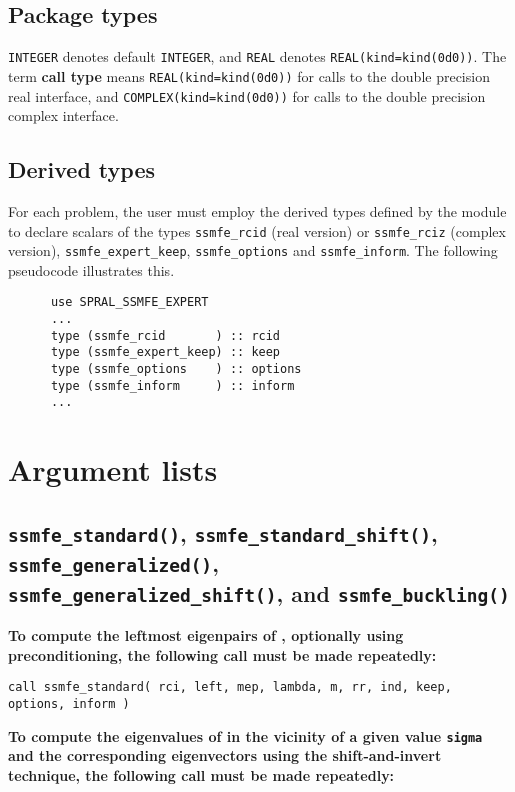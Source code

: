 \subsection{Package types} 

\texttt{INTEGER} denotes default \texttt{INTEGER}, and \texttt{REAL} denotes
\texttt{REAL(kind=kind(0d0))}. The term {\bf call type} means
\texttt{REAL(kind=kind(0d0))} for calls to the double precision real
interface, and \texttt{COMPLEX(kind=kind(0d0))} for calls to the double
precision complex interface.

\subsection{Derived types}

For each problem, the user must employ the derived types defined by the
module to declare scalars of the types 
{\tt ssmfe\_rcid} (real version) or 
{\tt ssmfe\_rciz} (complex version), 
{\tt ssmfe\_expert\_keep},
{\tt ssmfe\_options} and 
{\tt ssmfe\_inform}.
The following pseudocode illustrates this.
\begin{verbatim}
      use SPRAL_SSMFE_EXPERT
      ...
      type (ssmfe_rcid       ) :: rcid
      type (ssmfe_expert_keep) :: keep
      type (ssmfe_options    ) :: options
      type (ssmfe_inform     ) :: inform
      ...
\end{verbatim}


\section{Argument lists}

\subsection{%
   \texttt{ssmfe\_standard()},
   \texttt{ssmfe\_standard\_shift()},
   \texttt{ssmfe\_generalized()},\\
   \texttt{ssmfe\_generalized\_shift()}, and
   \texttt{ssmfe\_buckling()}
}

{\bf
To compute 
the leftmost eigenpairs of ,
optionally using preconditioning,
the following call must be made repeatedly:
}

\medskip
{\tt call
ssmfe\_standard( rci, left, mep, lambda, m, rr, ind, keep, options, inform )
}

\medskip
\noindent
{\bf
To compute the eigenvalues of  %
in the vicinity of a given value {\tt sigma}
and the corresponding eigenvectors using the shift-and-invert technique,
the following call must be made repeatedly:
}

